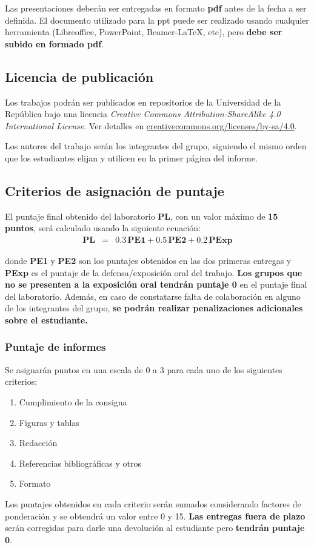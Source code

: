\documentclass[a4paper,11pt,twocolumn]{article}
\begin{document}
Las presentaciones deberán ser entregadas en formato \textbf{pdf} antes de la fecha a ser definida. %
%
El documento utilizado para la ppt puede ser realizado usando cualquier herramienta (Libreoffice, PowerPoint, Beamer-\LaTeX, etc), pero \textbf{debe ser subido en formado pdf}. %

\subsection{Licencia de publicación}

Los trabajos podrán ser publicados en repositorios de la Universidad de la República bajo una licencia \textit{Creative Commons Attribution-ShareAlike 4.0 International License}. Ver detalles en \href{https://creativecommons.org/licenses/by-sa/4.0/}{creativecommons.org/licenses/by-sa/4.0}.

Los autores del trabajo serán los integrantes del grupo, siguiendo el mismo orden que los estudiantes elijan y utilicen en la primer página del informe.
%
\subsection{Criterios de asignación de puntaje}

El puntaje final obtenido del laboratorio \textbf{PL}, con un valor máximo de \textbf{15 puntos}, será calculado usando la siguiente ecuación:
\begin{eqnarray}
\textbf{PL} &=& 0.3 \, \textbf{PE1} + 0.5 \, \textbf{PE2} + 0.2 \, \textbf{PExp} \nonumber
\end{eqnarray}

donde \textbf{PE1} y \textbf{PE2} son los puntajes obtenidos en las dos primeras entregas y \textbf{PExp} es el puntaje de la defensa/exposición oral del trabajo. \textbf{Los grupos que no se presenten a la exposición oral tendrán puntaje 0} en el puntaje final  del laboratorio. %
%
Además, en caso de constatarse falta de colaboración en alguno de los integrantes del grupo, \textbf{ se podrán realizar penalizaciones adicionales sobre el estudiante.} %


\subsubsection{Puntaje de informes}

Se asignarán puntos en una escala de 0 a 3 para cada uno de los siguientes criterios:
%
\begin{enumerate}
	\item Cumplimiento de la consigna
	\item Figuras y tablas
	\item Redacción
	\item Referencias bibliográficas y otros
	\item Formato
\end{enumerate}
%
Los puntajes obtenidos en cada criterio serán sumados considerando factores de ponderación y se obtendrá un valor entre 0 y 15. %
%
\textbf{Las entregas fuera de plazo} serán corregidas para darle una devolución al estudiante pero \textbf{tendrán puntaje 0}. %
\end{document}
